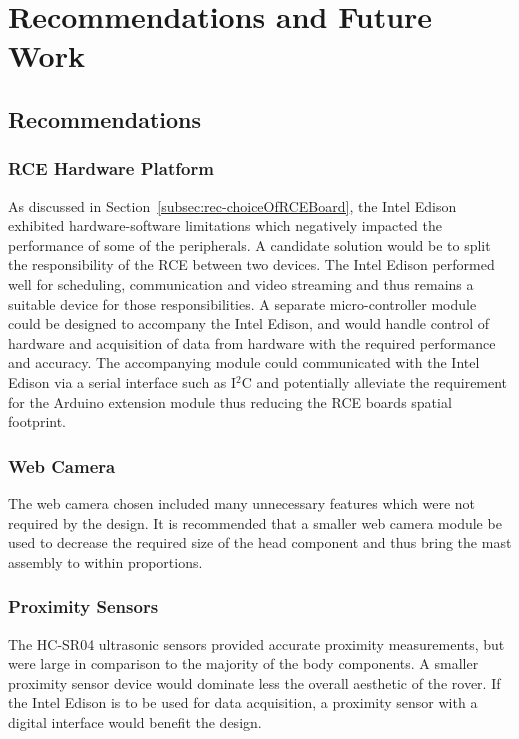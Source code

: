 \chapter{Recommendations and Future Work}
  \section{Recommendations}
    \subsection{RCE Hardware Platform}
      As discussed in Section~\ref{subsec:rec-choiceOfRCEBoard}, the Intel Edison exhibited hardware-software limitations which negatively impacted the performance of some of the peripherals. A candidate solution would be to split the responsibility of the RCE between two devices. The Intel Edison performed well for scheduling, communication and video streaming and thus remains a suitable device for those responsibilities. A separate micro-controller module could be designed to accompany the Intel Edison, and would handle control of hardware and acquisition of data from hardware with the required performance and accuracy. The accompanying module could communicated with the Intel Edison via a serial interface such as I$^2$C and potentially alleviate the requirement for the Arduino extension module thus reducing the RCE boards spatial footprint.
      
    \subsection{Web Camera}
      The web camera chosen included many unnecessary features which were not required by the design. It is recommended that a smaller web camera module be used to decrease the required size of the head component and thus bring the mast assembly to within proportions.
      
    \subsection{Proximity Sensors}
      The HC-SR04 ultrasonic sensors provided accurate proximity measurements, but were large in comparison to the majority of the body components. A smaller proximity sensor device would dominate less the overall aesthetic of the rover. If the Intel Edison is to be used for data acquisition, a proximity sensor with a digital interface would benefit the design.
      
